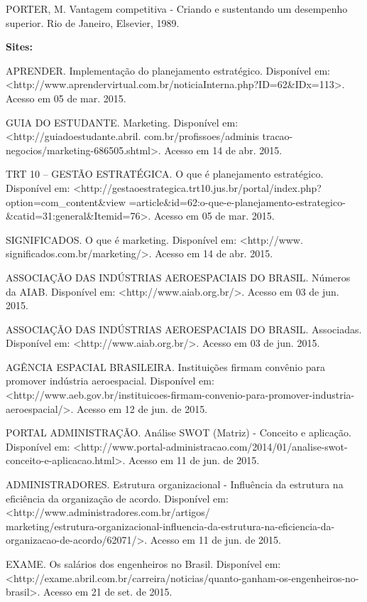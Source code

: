 \documentclass[
	12pt,				%
	openright,			%
	oneside,			%
	a4paper,			%
	english,			%
	french,				%
	spanish,			%
	brazil				%
	]{abntex2}
\begin{document}
PORTER, M. Vantagem competitiva - Criando e sustentando um desempenho superior. Rio de Janeiro, Elsevier, 1989.

	\textbf{Sites:}
	
	APRENDER. Implementação do planejamento estratégico. Disponível em: \linebreak <http://www.aprendervirtual.com.br/noticiaInterna.php?ID=62\&IDx=113>. Acesso em 05 de mar. 2015.
	
	GUIA DO ESTUDANTE. Marketing. Disponível em: <http://guiadoestudante.abril. com.br/profissoes/adminis tracao-negocios/marketing-686505.shtml>. Acesso em 14 de abr. 2015.
	
	TRT 10 – GESTÃO ESTRATÉGICA. O que é planejamento estratégico. Disponível em: <http://gestaoestrategica.trt10.jus.br/portal/index.php?option=com\_content\&view =article\&id=62:o-que-e-planejamento-estrategico-\&catid=31:general\&Itemid=76>. Acesso em 05 de mar. 2015.
	
	SIGNIFICADOS. O que é marketing. Disponível em: <http://www. significados.com.br/marketing/>. Acesso em 14 de abr. 2015.

	ASSOCIAÇÃO DAS INDÚSTRIAS AEROESPACIAIS DO BRASIL. Números da AIAB. Disponível em: <http://www.aiab.org.br/>. Acesso em 03 de jun. 2015.
	
	ASSOCIAÇÃO DAS INDÚSTRIAS AEROESPACIAIS DO BRASIL. Associadas. Disponível em: <http://www.aiab.org.br/>. Acesso em 03 de jun. 2015.
	
	AGÊNCIA ESPACIAL BRASILEIRA. Instituições firmam convênio para promover indústria aeroespacial. Disponível em: <http://www.aeb.gov.br/instituicoes-firmam-convenio-para-promover-industria-aeroespacial/>. Acesso em 12 de jun. de 2015.
	
	PORTAL ADMINISTRAÇÃO. Análise SWOT (Matriz) - Conceito e aplicação. Disponível em: <http://www.portal-administracao.com/2014/01/analise-swot-conceito-e-aplicacao.html>. Acesso em 11 de jun. de 2015.

	ADMINISTRADORES. Estrutura organizacional - Influência da estrutura na eficiência da organização de acordo. Disponível em: <http://www.administradores.com.br/artigos/\\marketing/estrutura-organizacional-influencia-da-estrutura-na-eficiencia-da-organizacao-de-acordo/62071/>. Acesso em 11 de jun. de 2015.
	
	EXAME. Os salários dos engenheiros no Brasil. Disponível em:\\ <http://exame.abril.com.br/carreira/noticias/quanto-ganham-os-engenheiros-no-brasil>. Acesso em 21 de set. de 2015.
	
\end{document}
